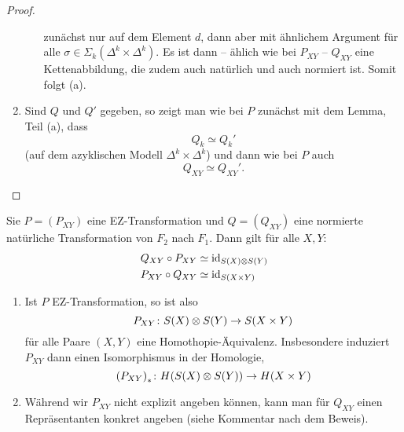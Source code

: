 \begin{proof}
\begin{enumerate}
\begin{enumerate}
\begin{equation*}
          \end{equation*}
          zunächst nur auf dem Element $d$, dann aber mit ähnlichem Argument für alle $\sigma \in \Sigma_k(\Delta^k \times \Delta^k)$.
          Es ist dann -- ählich wie bei $P_{XY}$ -- $Q_{XY}$ eine Kettenabbildung, die zudem auch natürlich und auch normiert ist.
          Somit folgt (a).
      \end{enumerate}
    \item
      Sind $Q$ und $Q'$ gegeben, so zeigt man wie bei $P$ zunächst mit dem Lemma, Teil (a), dass
      \begin{equation*}
        Q_k \simeq Q_k'
      \end{equation*}
      (auf dem azyklischen Modell $\Delta^k \times \Delta^k$) und dann wie bei $P$ auch
      \begin{equation*}
        Q_{XY} \simeq Q_{XY}'.
      \end{equation*}
  \end{enumerate}
\end{proof}

\begin{theorem}
  \label{thm:ez}
  Sie $P = {(P_{XY})}$ eine EZ-Transformation und $Q = {(Q_{XY})}$ eine normierte natürliche Transformation von $F_2$ nach $F_1$.
  Dann gilt für alle $X,Y$:
  \begin{align*}
    Q_{XY} \circ P_{XY} & \simeq \operatorname{id}_{S(X) \otimes S(Y)} \\
    P_{XY} \circ Q_{XY} & \simeq \operatorname{id}_{S(X \times Y)}
  \end{align*}
\end{theorem}

\begin{kommentar}
  \begin{enumerate}
    \item
      Ist $P$ EZ-Transformation, so ist also
      \begin{equation*}
        P_{XY} \colon S(X) \otimes S(Y) \to S(X \times Y)
      \end{equation*}
      für alle Paare $(X,Y)$ eine Homothopie-Äquivalenz.
      Insbesondere induziert $P_{XY}$ dann einen Isomorphismus in der Homologie,
      \begin{equation*}
        {(P_{XY})}_{*} \colon H(S(X) \otimes S(Y)) \to H(X \times Y)
      \end{equation*}
    \item
      Während wir $P_{XY}$ nicht explizit angeben können, kann man für $Q_{XY}$ einen Repräsentanten konkret angeben (siehe Kommentar nach dem Beweis).
  \end{enumerate}
\end{kommentar}

